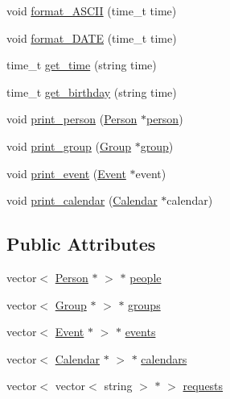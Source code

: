 \begin{DoxyCompactItemize}
\item 
void \hyperlink{classUserInterface_a41c109a7e042b44dc98a1250681fc684}{format\_\-ASCII} (time\_\-t time)
\item 
void \hyperlink{classUserInterface_a9226c83fcb42b9a1ee279e8b250ca68c}{format\_\-DATE} (time\_\-t time)
\item 
time\_\-t \hyperlink{classUserInterface_a0a4f683492e8a8565423ea501565c02e}{get\_\-time} (string time)
\item 
time\_\-t \hyperlink{classUserInterface_a313636d15fc03a167163b56f0223cab9}{get\_\-birthday} (string time)
\item 
void \hyperlink{classUserInterface_a45a7ad6cca95218631d8c6fbe49362e2}{print\_\-person} (\hyperlink{classPerson}{Person} $\ast$\hyperlink{group__content_8h_ab8664e6fd42f01eeaad084b5e20eb54e}{person})
\item 
void \hyperlink{classUserInterface_a31424519b61f71584a4a5196c6632beb}{print\_\-group} (\hyperlink{classGroup}{Group} $\ast$\hyperlink{group__content_8h_a27517aa1480ab2d9bfe5d62e693b33eb}{group})
\item 
void \hyperlink{classUserInterface_aca628f5a276b39ff4346e2150b419590}{print\_\-event} (\hyperlink{classEvent}{Event} $\ast$event)
\item 
void \hyperlink{classUserInterface_aca95eaf06d053b4ac267e94ccb84e501}{print\_\-calendar} (\hyperlink{classCalendar}{Calendar} $\ast$calendar)
\end{DoxyCompactItemize}
\subsection*{Public Attributes}
\begin{DoxyCompactItemize}
\item 
vector$<$ \hyperlink{classPerson}{Person} $\ast$ $>$ $\ast$ \hyperlink{classUserInterface_a3d0914e9d2ba661bc3691397c695287e}{people}
\item 
vector$<$ \hyperlink{classGroup}{Group} $\ast$ $>$ $\ast$ \hyperlink{classUserInterface_a12676e629660c43c63eb5b01c5c19bc3}{groups}
\item 
vector$<$ \hyperlink{classEvent}{Event} $\ast$ $>$ $\ast$ \hyperlink{classUserInterface_ae3370dc0d02c19b4b1cc7c47221c2bfa}{events}
\item 
vector$<$ \hyperlink{classCalendar}{Calendar} $\ast$ $>$ $\ast$ \hyperlink{classUserInterface_abd1f3233d3e666415f6cdf8458b50faa}{calendars}
\item 
vector$<$ vector$<$ string $>$ $\ast$ $>$ \hyperlink{classUserInterface_af1cb3bd8de564e4610d863937986d60e}{requests}
\end{DoxyCompactItemize}


